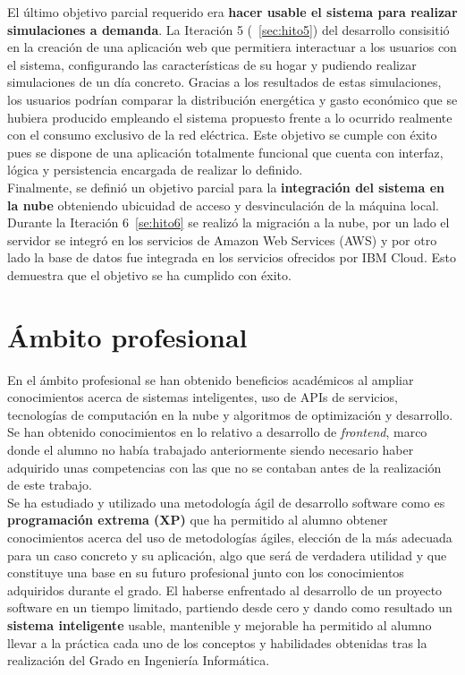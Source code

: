 El último objetivo parcial requerido era \textbf{hacer usable el sistema para realizar simulaciones a demanda}. La Iteración 5 (~\ref{sec:hito5}) del desarrollo consisitió en la creación de una aplicación web que permitiera interactuar a los usuarios con el sistema, configurando las características de su hogar y pudiendo realizar simulaciones de un día concreto. Gracias a los resultados de estas simulaciones, los usuarios podrían comparar la distribución energética y gasto económico que se hubiera producido empleando el sistema propuesto frente a lo ocurrido realmente con el consumo exclusivo de la red eléctrica. Este objetivo se cumple con éxito pues se dispone de una aplicación totalmente funcional que cuenta con interfaz, lógica y persistencia encargada de realizar lo definido.\\

Finalmente, se definió un objetivo parcial para la \textbf{integración del sistema en la nube} obteniendo ubicuidad de acceso y desvinculación de la máquina local. Durante la Iteración 6~\ref{se:hito6} se realizó la migración a la nube, por un lado el servidor se integró en los servicios de Amazon Web Services (AWS) y por otro lado la base de datos fue integrada en los servicios ofrecidos por IBM Cloud. Esto demuestra que el objetivo se ha cumplido con éxito.\\
\section{Ámbito profesional}
En el ámbito profesional se han obtenido beneficios académicos al ampliar conocimientos acerca de sistemas inteligentes, uso de APIs de servicios, tecnologías de computación en la nube y algoritmos de optimización y desarrollo. Se han obtenido conocimientos en lo relativo a desarrollo de \textit{frontend}, marco donde el alumno no había trabajado anteriormente siendo necesario haber adquirido unas competencias con las que no se contaban antes de la realización de este trabajo.\\
Se ha estudiado y utilizado una metodología ágil de desarrollo software como es \textbf{programación extrema (XP)} que ha permitido al alumno obtener conocimientos acerca del uso de metodologías ágiles, elección de la más adecuada para un caso concreto y su aplicación, algo que será de verdadera utilidad y que constituye una base en su futuro profesional junto con los conocimientos adquiridos durante el grado. El haberse enfrentado al desarrollo de un proyecto software en un tiempo limitado, partiendo desde cero y dando como resultado un \textbf{sistema inteligente} usable, mantenible y mejorable ha permitido al alumno llevar a la práctica cada uno de los conceptos y habilidades obtenidas tras la realización del Grado en Ingeniería Informática.\\

